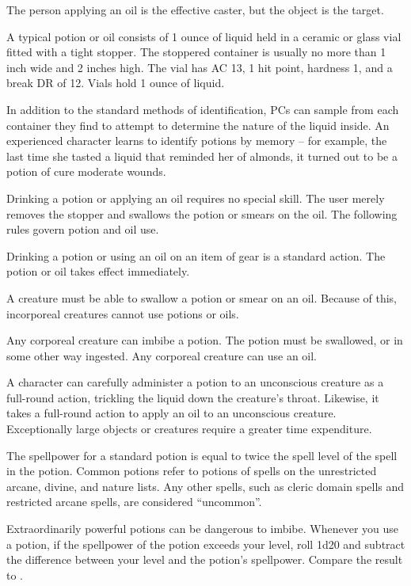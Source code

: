         The person applying an oil is the effective caster, but the object is the target.

         A typical potion or oil consists of 1 ounce of liquid held in a ceramic or glass vial fitted with a tight stopper.
        The stoppered container is usually no more than 1 inch wide and 2 inches high.
        The vial has AC 13, 1 hit point, hardness 1, and a break DR of 12.
        Vials hold 1 ounce of liquid.

         In addition to the standard methods of identification, PCs can sample from each container they find to attempt to determine the nature of the liquid inside.
        An experienced character learns to identify potions by memory -- for example, the last time she tasted a liquid that reminded her of almonds, it turned out to be a potion of cure moderate wounds.

         Drinking a potion or applying an oil requires no special skill.
        The user merely removes the stopper and swallows the potion or smears on the oil.
        The following rules govern potion and oil use.

        Drinking a potion or using an oil on an item of gear is a standard action.
        The potion or oil takes effect immediately.

        A creature must be able to swallow a potion or smear on an oil.
        Because of this, incorporeal creatures cannot use potions or oils.

        Any corporeal creature can imbibe a potion.
        The potion must be swallowed, or in some other way ingested.
        Any corporeal creature can use an oil.

        A character can carefully administer a potion to an unconscious creature as a full-round action, trickling the liquid down the creature's throat.
        Likewise, it takes a full-round action to apply an oil to an unconscious creature.
        Exceptionally large objects or creatures require a greater time expenditure.

         The spellpower for a standard potion is equal to twice the spell level of the spell in the potion.
        Common potions refer to potions of spells on the unrestricted arcane, divine, and nature lists.
        Any other spells, such as cleric domain spells and restricted arcane spells, are considered ``uncommon''.

         Extraordinarily powerful potions can be dangerous to imbibe.
        Whenever you use a potion, if the spellpower of the potion exceeds your level, roll 1d20 and subtract the difference between your level and the potion's spellpower.
        Compare the result to .

